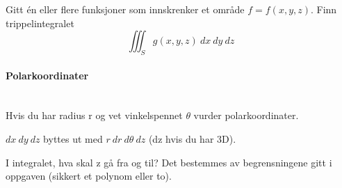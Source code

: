 Gitt én eller flere funksjoner som innskrenker et område $f = f(x,y,z)$.
Finn trippelintegralet
$$\iiint_S g(x,y,z) \: dx \: dy \: dz$$



\paragraph{Polarkoordinater} \mbox{} \\
Hvis du har radius r og vet vinkelspennet $\theta$ vurder polarkoordinater.

$dx \: dy \: dz$ byttes ut med $r \: dr \: d\theta \: dz$ (dz hvis du har 3D).

I integralet, hva skal z gå fra og til?
Det bestemmes av begrensningene gitt i oppgaven (sikkert et polynom eller to).
